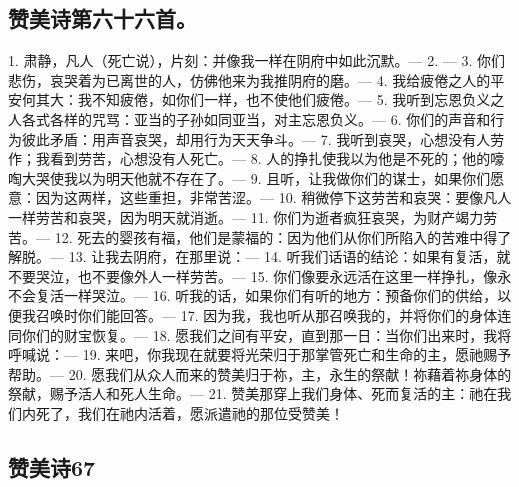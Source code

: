 
\subsection{赞美诗第六十六首。}

1. 肃静，凡人（死亡说），片刻：并像我一样在阴府中如此沉默。— 2. — 3. 你们悲伤，哀哭着为已离世的人，仿佛他来为我推阴府的磨。— 4. 我给疲倦之人的平安何其大：我不知疲倦，如你们一样，也不使他们疲倦。— 5. 我听到忘恩负义之人各式各样的咒骂：亚当的子孙如同亚当，对主忘恩负义。— 6. 你们的声音和行为彼此矛盾：用声音哀哭，却用行为天天争斗。— 7. 我听到哀哭，心想没有人劳作；我看到劳苦，心想没有人死亡。— 8. 人的挣扎使我以为他是不死的；他的嚎啕大哭使我以为明天他就不存在了。— 9. 且听，让我做你们的谋士，如果你们愿意：因为这两样，这些重担，非常苦涩。— 10. 稍微停下这劳苦和哀哭：要像凡人一样劳苦和哀哭，因为明天就消逝。— 11. 你们为逝者疯狂哀哭，为财产竭力劳苦。— 12. 死去的婴孩有福，他们是蒙福的：因为他们从你们所陷入的苦难中得了解脱。— 13. 让我去阴府，在那里说：— 14. 听我们话语的结论：如果有复活，就不要哭泣，也不要像外人一样劳苦。— 15. 你们像要永远活在这里一样挣扎，像永不会复活一样哭泣。— 16. 听我的话，如果你们有听的地方：预备你们的供给，以便我召唤时你们能回答。— 17. 因为我，我也听从那召唤我的，并将你们的身体连同你们的财宝恢复。— 18. 愿我们之间有平安，直到那一日：当你们出来时，我将呼喊说：— 19. 来吧，你我现在就要将光荣归于那掌管死亡和生命的主，愿祂赐予帮助。— 20. 愿我们从众人而来的赞美归于祢，主，永生的祭献！祢藉着祢身体的祭献，赐予活人和死人生命。— 21. 赞美那穿上我们身体、死而复活的主：祂在我们内死了，我们在祂内活着，愿派遣祂的那位受赞美！\par


\subsection{赞美诗67}

